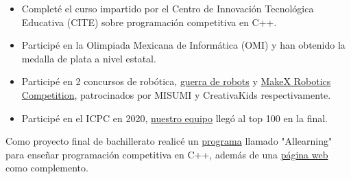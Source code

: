 \documentclass[10pt,a4paper,ragged2e,withhyper]{altacv}
\begin{document}
\begin{paracol}{2}
  \begin{itemize}
    \item Completé el curso impartido por el Centro de Innovación Tecnológica Educativa (CITE) sobre programación competitiva en C++.
    \item Participé en la Olimpiada Mexicana de Informática (OMI) y han obtenido la medalla de plata a nivel estatal.
  \end{itemize}
  \divider
  \begin{itemize}
    \item Participé en 2 concursos de robótica, {\href{https://drive.google.com/file/d/1xETjexZx_X1Bg46y_-m8kKneEbaz48dQ/view?usp=sharing}{\color{blue}guerra de robots\color{black}}} y {\href{https://drive.google.com/file/d/1QcXzJbDVQ1dSvtQrdd_j387KvKlfXH8J/view?usp=sharing}{\color{blue}MakeX Robotics Competition\color{black}}}, patrocinados por MISUMI y CreativaKids respectivamente.
  \end{itemize}
  \divider
  \begin{itemize}
    \item Participé en el ICPC en 2020, {\href{https://drive.google.com/file/d/1OwYn_YItOoTw_DI-Dajlrwc_oC57Rv6G/view?usp=sharing}{\color{blue}nuestro equipo\color{black}}} llegó al top 100 en la final.
  \end{itemize}

  \switchcolumn

  \divider

  {Como proyecto final de bachillerato realicé un {\href{https://github.com/KevinUrielAdler/Allearning}{\color{blue}programa\color{black}}} llamado "Allearning" para enseñar programación competitiva en C++, además de una {\href{https://github.com/KevinUrielAdler/Allearning-Web}{\color{blue}página web\color{black}}} como complemento.}
  \divider


\end{paracol}
\end{document}
